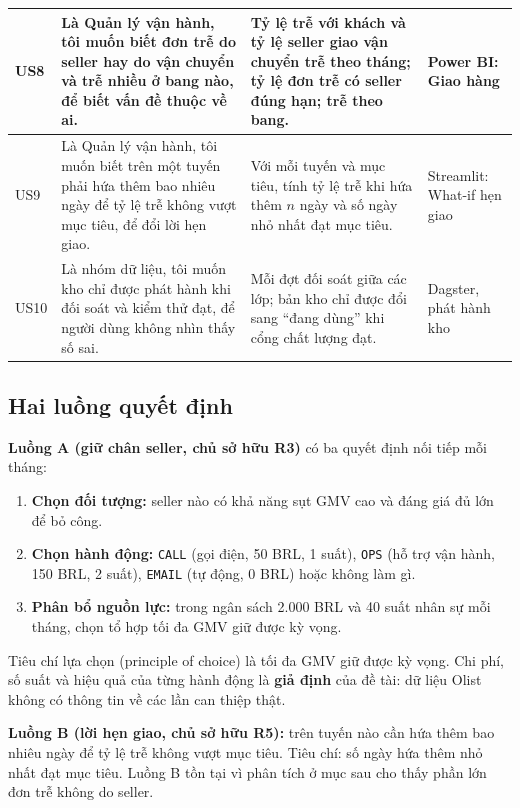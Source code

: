 \begin{table}[htbp]
\begin{tabularx}{\textwidth}{|>{\centering\arraybackslash}m{0.75cm}|>{\raggedright\arraybackslash}m{5.0cm}|L|>{\raggedright\arraybackslash}m{2.5cm}|}
\hline
US8 & Là Quản lý vận hành, tôi muốn biết đơn trễ do seller hay do vận chuyển và trễ nhiều ở bang nào, để biết vấn đề thuộc về ai. & Tỷ lệ trễ với khách và tỷ lệ seller giao vận chuyển trễ theo tháng; tỷ lệ đơn trễ có seller đúng hạn; trễ theo bang. & Power BI: Giao hàng \\
\hline
US9 & Là Quản lý vận hành, tôi muốn biết trên một tuyến phải hứa thêm bao nhiêu ngày để tỷ lệ trễ không vượt mục tiêu, để đổi lời hẹn giao. & Với mỗi tuyến và mục tiêu, tính tỷ lệ trễ khi hứa thêm $n$ ngày và số ngày nhỏ nhất đạt mục tiêu. & Streamlit: What-if hẹn giao \\
\hline
US10 & Là nhóm dữ liệu, tôi muốn kho chỉ được phát hành khi đối soát và kiểm thử đạt, để người dùng không nhìn thấy số sai. & Mỗi đợt đối soát giữa các lớp; bản kho chỉ được đổi sang ``đang dùng'' khi cổng chất lượng đạt. & Dagster, phát hành kho \\
\hline
\end{tabularx}
\end{table}

\subsection{Hai luồng quyết định}
\textbf{Luồng A (giữ chân seller, chủ sở hữu R3)} có ba quyết định nối tiếp mỗi tháng:
\begin{enumerate}
    \item \textbf{Chọn đối tượng:} seller nào có khả năng sụt GMV cao và đáng giá đủ lớn để bỏ công.
    \item \textbf{Chọn hành động:} \texttt{CALL} (gọi điện, 50 BRL, 1 suất), \texttt{OPS} (hỗ trợ vận hành, 150 BRL, 2 suất), \texttt{EMAIL} (tự động, 0 BRL) hoặc không làm gì.
    \item \textbf{Phân bổ nguồn lực:} trong ngân sách 2.000 BRL và 40 suất nhân sự mỗi tháng, chọn tổ hợp tối đa GMV giữ được kỳ vọng.
\end{enumerate}
Tiêu chí lựa chọn (principle of choice) là tối đa GMV giữ được kỳ vọng. Chi phí, số suất và hiệu quả của từng hành động là \textbf{giả định} của đề tài: dữ liệu Olist không có thông tin về các lần can thiệp thật.

\textbf{Luồng B (lời hẹn giao, chủ sở hữu R5):} trên tuyến nào cần hứa thêm bao nhiêu ngày để tỷ lệ trễ không vượt mục tiêu. Tiêu chí: số ngày hứa thêm nhỏ nhất đạt mục tiêu. Luồng B tồn tại vì phân tích ở mục sau cho thấy phần lớn đơn trễ không do seller.

